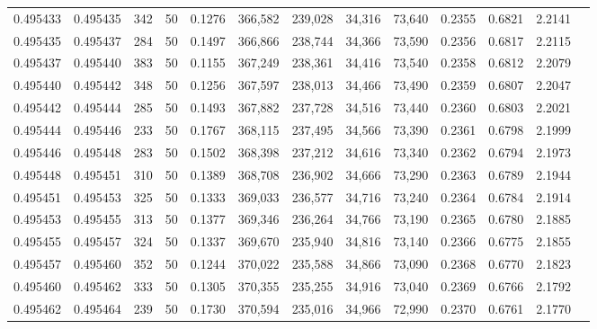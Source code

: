 \begin{tabular}{rrrrrrrrrrrrr}
0.495433 & 0.495435 &   342 &  50 &                                     0.1276 & 366,582 & 239,028 &  34,316 &  73,640 & 0.2355 & 0.6821 & 2.2141 \\
0.495435 & 0.495437 &   284 &  50 &                                     0.1497 & 366,866 & 238,744 &  34,366 &  73,590 & 0.2356 & 0.6817 & 2.2115 \\
0.495437 & 0.495440 &   383 &  50 &                                     0.1155 & 367,249 & 238,361 &  34,416 &  73,540 & 0.2358 & 0.6812 & 2.2079 \\
0.495440 & 0.495442 &   348 &  50 &                                     0.1256 & 367,597 & 238,013 &  34,466 &  73,490 & 0.2359 & 0.6807 & 2.2047 \\
0.495442 & 0.495444 &   285 &  50 &                                     0.1493 & 367,882 & 237,728 &  34,516 &  73,440 & 0.2360 & 0.6803 & 2.2021 \\
0.495444 & 0.495446 &   233 &  50 &                                     0.1767 & 368,115 & 237,495 &  34,566 &  73,390 & 0.2361 & 0.6798 & 2.1999 \\
0.495446 & 0.495448 &   283 &  50 &                                     0.1502 & 368,398 & 237,212 &  34,616 &  73,340 & 0.2362 & 0.6794 & 2.1973 \\
0.495448 & 0.495451 &   310 &  50 &                                     0.1389 & 368,708 & 236,902 &  34,666 &  73,290 & 0.2363 & 0.6789 & 2.1944 \\
0.495451 & 0.495453 &   325 &  50 &                                     0.1333 & 369,033 & 236,577 &  34,716 &  73,240 & 0.2364 & 0.6784 & 2.1914 \\
0.495453 & 0.495455 &   313 &  50 &                                     0.1377 & 369,346 & 236,264 &  34,766 &  73,190 & 0.2365 & 0.6780 & 2.1885 \\
0.495455 & 0.495457 &   324 &  50 &                                     0.1337 & 369,670 & 235,940 &  34,816 &  73,140 & 0.2366 & 0.6775 & 2.1855 \\
0.495457 & 0.495460 &   352 &  50 &                                     0.1244 & 370,022 & 235,588 &  34,866 &  73,090 & 0.2368 & 0.6770 & 2.1823 \\
0.495460 & 0.495462 &   333 &  50 &                                     0.1305 & 370,355 & 235,255 &  34,916 &  73,040 & 0.2369 & 0.6766 & 2.1792 \\
0.495462 & 0.495464 &   239 &  50 &                                     0.1730 & 370,594 & 235,016 &  34,966 &  72,990 & 0.2370 & 0.6761 & 2.1770 \\

\end{tabular}
